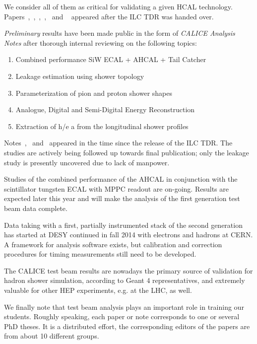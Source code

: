 We consider all of them as critical for validating a given HCAL technology. Papers~\cite{1748-0221-8-07-P07005},~\cite{1748-0221-9-01-P01004},~\cite{1748-0221-8-09-P09001},~\cite{CALICE:t3bpaper},~\cite{Calice:proton paper} and ~\cite{Calice:WpaperHigh} appeared after the ILC TDR was handed over.

\emph{Preliminary} results have been made public in the form of \emph{CALICE Analysis Notes} after thorough internal reviewing on the following topics:
\begin{enumerate}
\item Combined performance SiW ECAL + AHCAL + Tail Catcher ~\cite{CALICE:CAN015}
\item Leakage estimation using shower topology~\cite{CALICE:CAN029}
\item Parameterization of pion and proton shower shapes~\cite{Calice:CAN048}
\item Analogue, Digital and Semi-Digital Energy Reconstruction~\cite{Calice:CAN049}
\item Extraction of h/e a from the longitudinal shower profiles~\cite{Calice:CAN051}
\end{enumerate}

Notes~\cite{Calice:CAN048},~\cite{Calice:CAN049} and~\cite{Calice:CAN051} appeared in the time since the release of the ILC TDR. The studies are actively being followed up towards final publication; only the leakage study is presently uncovered due to lack of manpower.

Studies of the combined performance of the AHCAL in conjunction with the scintillator tungsten ECAL with MPPC readout are on-going. Results are expected later this year and will make the analysis of the first generation test beam data complete.

Data taking with a first, partially instrumented stack of the second generation has started at DESY continued in fall 2014 with electrons and hadrons at CERN. A framework for analysis software exists, but calibration and correction procedures for timing measurements still need to be developed.

The CALICE test beam results are nowadays the primary source of validation for hadron shower simulation, according to Geant 4 representatives, and extremely valuable for other HEP experiments, e.g. at the LHC, as well.

We finally note that test beam analysis plays an important role in training our students. Roughly speaking, each paper or note corresponds to one or several PhD theses. It is a distributed effort, the corresponding editors of the papers are from about 10 different groups.

